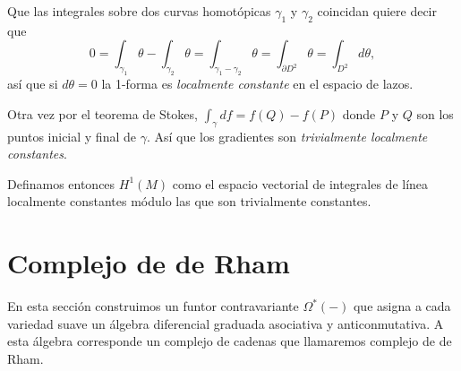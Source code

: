 \documentclass[spanish]{article}
\theoremstyle{definition}
\begin{document}
	Que las integrales sobre dos curvas homotópicas $\gamma_1$ y $\gamma_2$ coincidan
	quiere decir que
	\[0=\int_{\gamma_1}\theta-\int_{\gamma_2}\theta=\int_{\gamma_1-\gamma_2}\theta=\int_{\partial D^2}\theta=\int_{D^2}d\theta,\]
	así que si $d\theta=0$ la 1-forma es \textit{localmente constante} en el espacio de lazos.
	
	Otra vez por el teorema de Stokes, $\int_\gamma df=f(Q)-f(P)$ donde $P$ y $Q$ son los puntos inicial y final de $\gamma$. Así que los gradientes son \textit{trivialmente localmente constantes}.
	
	Definamos entonces $H^1(M)$ como el espacio vectorial de integrales de línea localmente constantes módulo las que son trivialmente constantes.
	
	\section{Complejo de de Rham}\label{sec:2}
	En esta sección construimos un funtor contravariante $\Omega^*(-)$ que asigna a cada variedad suave un álgebra diferencial graduada asociativa y anticonmutativa. A esta álgebra corresponde un complejo de cadenas que llamaremos complejo de de Rham.
\end{document}
